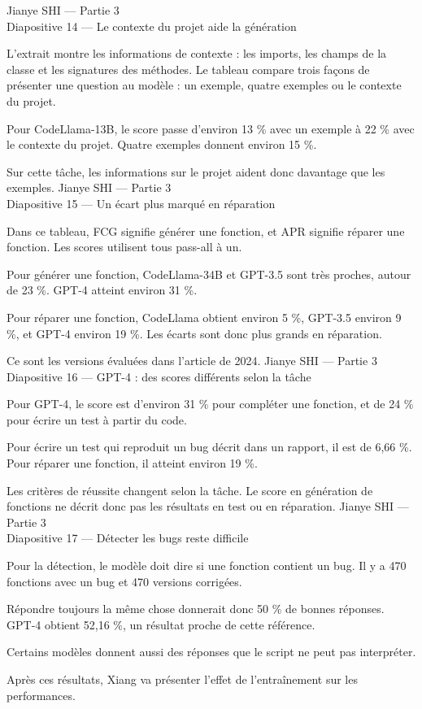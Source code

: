 \documentclass[12pt,a4paper]{article}
\begin{document}
Jianye SHI — Partie 3\\
{\Large\color{titre} Diapositive 14 — Le contexte du projet aide la génération}\par
\bigskip
L’extrait montre les informations de contexte : les imports, les champs de la classe et les signatures des méthodes. Le tableau compare trois façons de présenter une question au modèle : un exemple, quatre exemples ou le contexte du projet.

Pour CodeLlama-13B, le score passe d’environ 13 \% avec un exemple à 22 \% avec le contexte du projet. Quatre exemples donnent environ 15 \%.

Sur cette tâche, les informations sur le projet aident donc davantage que les exemples.
\newpage
Jianye SHI — Partie 3\\
{\Large\color{titre} Diapositive 15 — Un écart plus marqué en réparation}\par
\bigskip
Dans ce tableau, FCG signifie générer une fonction, et APR signifie réparer une fonction. Les scores utilisent tous pass-all à un.

Pour générer une fonction, CodeLlama-34B et GPT-3.5 sont très proches, autour de 23 \%. GPT-4 atteint environ 31 \%.

Pour réparer une fonction, CodeLlama obtient environ 5 \%, GPT-3.5 environ 9 \%, et GPT-4 environ 19 \%. Les écarts sont donc plus grands en réparation.

Ce sont les versions évaluées dans l’article de 2024.
\newpage
Jianye SHI — Partie 3\\
{\Large\color{titre} Diapositive 16 — GPT-4 : des scores différents selon la tâche}\par
\bigskip
Pour GPT-4, le score est d’environ 31 \% pour compléter une fonction, et de 24 \% pour écrire un test à partir du code.

Pour écrire un test qui reproduit un bug décrit dans un rapport, il est de 6,66 \%. Pour réparer une fonction, il atteint environ 19 \%.

Les critères de réussite changent selon la tâche. Le score en génération de fonctions ne décrit donc pas les résultats en test ou en réparation.
\newpage
Jianye SHI — Partie 3\\
{\Large\color{titre} Diapositive 17 — Détecter les bugs reste difficile}\par
\bigskip
Pour la détection, le modèle doit dire si une fonction contient un bug. Il y a 470 fonctions avec un bug et 470 versions corrigées.

Répondre toujours la même chose donnerait donc 50 \% de bonnes réponses. GPT-4 obtient 52,16 \%, un résultat proche de cette référence.

Certains modèles donnent aussi des réponses que le script ne peut pas interpréter.

Après ces résultats, Xiang va présenter l’effet de l’entraînement sur les performances.
\end{document}
